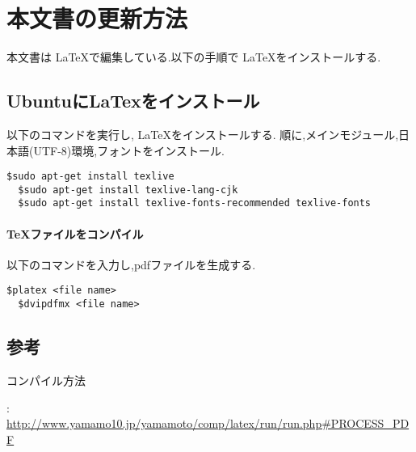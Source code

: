 \section{本文書の更新方法}
本文書は \LaTeX で編集している.以下の手順で \LaTeX をインストールする.
\subsection{UbuntuにLaTexをインストール}
以下のコマンドを実行し, \LaTeX をインストールする.
順に,メインモジュール,日本語(UTF-8)環境,フォントをインストール.
\begin{lstlisting}[]
  $sudo apt-get install texlive
  $sudo apt-get install texlive-lang-cjk
  $sudo apt-get install texlive-fonts-recommended texlive-fonts
\end{lstlisting}

\paragraph{\TeX ファイルをコンパイル} \leavevmode

以下のコマンドを入力し,pdfファイルを生成する.
\begin{lstlisting}[]
  $platex <file name>
  $dvipdfmx <file name>
\end{lstlisting}

\subsection{参考}
コンパイル方法

: \url{http://www.yamamo10.jp/yamamoto/comp/latex/run/run.php#PROCESS_PDF}
